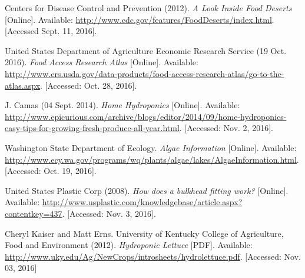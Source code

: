 \documentclass[12pt]{article}
\begin{document}
\pagebreak

\begin{thebibliography}{9}
    Centers for Disease Control and Prevention (2012).
    \textit{A Look Inside Food Deserts} [Online].
    Available: \url{http://www.cdc.gov/features/FoodDeserts/index.html}.
    [Accessed Sept. 11, 2016].

    United States Department of Agriculture Economic Research Service (19 Oct. 2016).
    \textit{Food Access Research Atlas} [Online].
    Available:
    \url{http://www.ers.usda.gov/data-products/food-access-research-atlas/go-to-the-atlas.aspx}.
    [Accessed: Oct. 28, 2016].

    J. Camas (04 Sept. 2014).
    \textit{Home Hydroponics} [Online].
    Available:
    \url{http://www.epicurious.com/archive/blogs/editor/2014/09/home-hydroponics-easy-tips-for-growing-fresh-produce-all-year.html}.
    [Accessed: Nov. 2, 2016].

    Washington State Department of Ecology.
    \textit{Algae Information} [Online].
    Available: \url{http://www.ecy.wa.gov/programs/wq/plants/algae/lakes/AlgaeInformation.html}.
    [Accessed: Oct. 19, 2016].

    United States Plastic Corp (2008).
    \textit{How does a bulkhead fitting work?} [Online].
    Available: \url{http://www.usplastic.com/knowledgebase/article.aspx?contentkey=437}.
    [Accessed: Nov. 3, 2016].

    Cheryl Kaiser and Matt Erns.
    University of Kentucky College of Agriculture, Food and Environment (2012).
    \textit{Hydroponic Lettuce} [PDF].
    Available: \url{http://www.uky.edu/Ag/NewCrops/introsheets/hydrolettuce.pdf}.
    [Accessed: Nov. 03, 2016]

\end{thebibliography}
\end{document}
